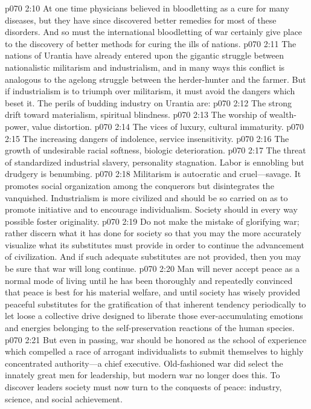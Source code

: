 \vs p070 2:10 At one time physicians believed in bloodletting as a cure for many diseases, but they have since discovered better remedies for most of these disorders. And so must the international bloodletting of war certainly give place to the discovery of better methods for curing the ills of nations.
\vs p070 2:11 The nations of Urantia have already entered upon the gigantic struggle between nationalistic militarism and industrialism, and in many ways this conflict is analogous to the agelong struggle between the herder\hyp{}hunter and the farmer. But if industrialism is to triumph over militarism, it must avoid the dangers which beset it. The perils of budding industry on Urantia are:
\pc \vs p070 2:12 \bibnobreakspace The strong drift toward materialism, spiritual blindness.
\vs p070 2:13 \bibnobreakspace The worship of wealth\hyp{}power, value distortion.
\vs p070 2:14 \bibnobreakspace The vices of luxury, cultural immaturity.
\vs p070 2:15 \bibnobreakspace The increasing dangers of indolence, service insensitivity.
\vs p070 2:16 \bibnobreakspace The growth of undesirable racial softness, biologic deterioration.
\vs p070 2:17 \bibnobreakspace The threat of standardized industrial slavery, personality stagnation. Labor is ennobling but drudgery is benumbing.
\pc \vs p070 2:18 Militarism is autocratic and cruel---savage. It promotes social organization among the conquerors but disintegrates the vanquished. Industrialism is more civilized and should be so carried on as to promote initiative and to encourage individualism. Society should in every way possible foster originality.
\vs p070 2:19 Do not make the mistake of glorifying war; rather discern what it has done for society so that you may the more accurately visualize what its substitutes must provide in order to continue the advancement of civilization. And if such adequate substitutes are not provided, then you may be sure that war will long continue.
\vs p070 2:20 Man will never accept peace as a normal mode of living until he has been thoroughly and repeatedly convinced that peace is best for his material welfare, and until society has wisely provided peaceful substitutes for the gratification of that inherent tendency periodically to let loose a collective drive designed to liberate those ever\hyp{}accumulating emotions and energies belonging to the self\hyp{}preservation reactions of the human species.
\vs p070 2:21 But even in passing, war should be honored as the school of experience which compelled a race of arrogant individualists to submit themselves to highly concentrated authority---a chief executive. Old\hyp{}fashioned war did select the innately great men for leadership, but modern war no longer does this. To discover leaders society must now turn to the conquests of peace: industry, science, and social achievement.

